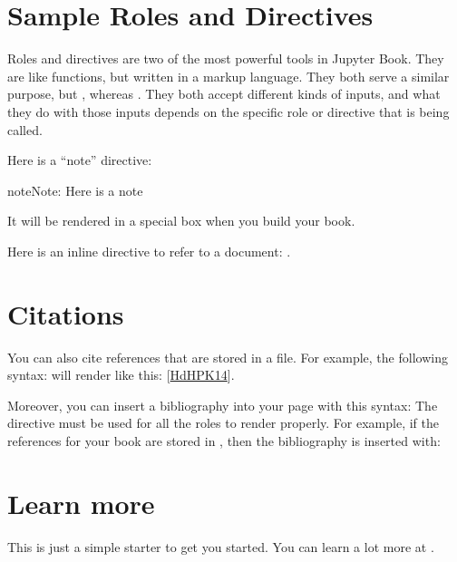 \documentclass[letterpaper,10pt,english]{jupyterBook}
\begin{document}
\section{Sample Roles and Directives}
\label{\detokenize{markdown:sample-roles-and-directives}}
\sphinxAtStartPar
Roles and directives are two of the most powerful tools in Jupyter Book. They
are like functions, but written in a markup language. They both
serve a similar purpose, but , whereas
. They both accept different kinds of inputs,
and what they do with those inputs depends on the specific role or directive
that is being called.

\sphinxAtStartPar
Here is a “note” directive:

\begin{sphinxadmonition}{note}{Note:}
\sphinxAtStartPar
Here is a note
\end{sphinxadmonition}

\sphinxAtStartPar
It will be rendered in a special box when you build your book.

\sphinxAtStartPar
Here is an inline directive to refer to a document: {\hyperref[\detokenize{markdown-notebooks::doc}]{}}.


\section{Citations}
\label{\detokenize{markdown:citations}}
\sphinxAtStartPar
You can also cite references that are stored in a  file. For example,
the following syntax:  will render like
this: {[}\hyperlink{cite.markdown:id3}{HdHPK14}{]}.

\sphinxAtStartPar
Moreover, you can insert a bibliography into your page with this syntax:
The  directive must be used for all the  roles to
render properly.
For example, if the references for your book are stored in ,
then the bibliography is inserted with:


\section{Learn more}
\label{\detokenize{markdown:learn-more}}
\sphinxAtStartPar
This is just a simple starter to get you started.
You can learn a lot more at .
\end{document}
